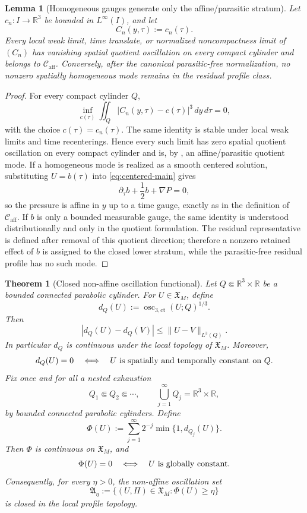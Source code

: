 \documentclass[11pt]{amsart}
\numberwithin{equation}{section}
\theoremstyle{plain}
\newtheorem{theorem}{Theorem}[section]
\newtheorem{lemma}[lemma]{Lemma}
\theoremstyle{definition}
\theoremstyle{remark}
\newcommand{\Caff}{\mathcal C_{\mathrm{aff}}}
\newcommand{\actthree}{\operatorname{osc}_{3,\mathrm{ct}}}
\begin{document}
\begin{lemma}[Homogeneous gauges generate only the affine/parasitic stratum]
\label{lem:homogeneous-gauges-are-affine-stratum}
Let \(c_n:I\to\mathbb R^3\) be bounded in \(L^\infty(I)\), and let
\[
   C_n(y,\tau):=c_n(\tau).
\]
Every local weak limit, time translate, or normalized noncompactness limit of
\((C_n)\) has vanishing spatial quotient oscillation on every compact cylinder
and belongs to \(\Caff\).  Conversely, after the canonical
parasitic-free normalization, no nonzero spatially homogeneous mode remains in
the residual profile class.
\end{lemma}

\begin{proof}
For every compact cylinder \(Q\),
\[
   \inf_{c(\tau)}
   \iint_Q |C_n(y,\tau)-c(\tau)|^3\,dy\,d\tau=0,
\]
with the choice \(c(\tau)=c_n(\tau)\).  The same identity is stable under local
weak limits and time recenterings.  Hence every such limit has zero spatial
quotient oscillation on every compact cylinder and is, by
, an affine/parasitic quotient mode.
If a homogeneous mode is realized as a smooth centered solution, substituting
\(U=b(\tau)\) into \eqref{eq:centered-main} gives
\[
   \partial_\tau b+\frac12b+\nabla P=0,
\]
so the pressure is affine in \(y\) up to a time gauge, exactly as in the
definition of \(\Caff\).  If \(b\) is only a bounded measurable gauge, the same
identity is understood distributionally and only in the quotient formulation.
The residual representative is defined after removal of this quotient
direction; therefore a nonzero retained effect of \(b\) is assigned to the
closed lower stratum, while the parasitic-free residual profile has no such mode.
\end{proof}

\begin{theorem}[Closed non-affine oscillation functional]
\label{thm:closed-nonaffine-activity}
Let \(Q\Subset\mathbb R^3\times\mathbb R\) be a bounded connected parabolic
cylinder.  For \(U\in\mathfrak X_M\), define
\[
   d_Q(U)
   :=
   \actthree(U;Q)^{1/3}.
\]
Then
\[
   |d_Q(U)-d_Q(V)|
   \le
   \|U-V\|_{L^3(Q)} .
\]
In particular \(d_Q\) is continuous under the local topology of
\(\mathfrak X_M\).  Moreover,
\[
   d_Q(U)=0
   \quad\Longleftrightarrow\quad
   U \hbox{ is spatially and temporally constant on } Q .
\]
Fix once and for all a nested exhaustion
\[
   Q_1\Subset Q_2\Subset\cdots,\qquad
   \bigcup_{j=1}^{\infty}Q_j=\mathbb R^3\times\mathbb R,
\]
by bounded connected parabolic cylinders.  Define
\[
   \Phi(U)
   :=
   \sum_{j=1}^{\infty}2^{-j}\min\{1,d_{Q_j}(U)\}.
\]
Then \(\Phi\) is continuous on \(\mathfrak X_M\), and
\[
   \Phi(U)=0
   \quad\Longleftrightarrow\quad
   U \hbox{ is globally constant}.
\]
Consequently, for every \(\eta>0\), the non-affine oscillation set
\[
   \mathfrak A_\eta
   :=
   \{(U,\Pi)\in\mathfrak X_M:\Phi(U)\ge\eta\}
\]
is closed in the local profile topology.
\end{theorem}
\end{document}
